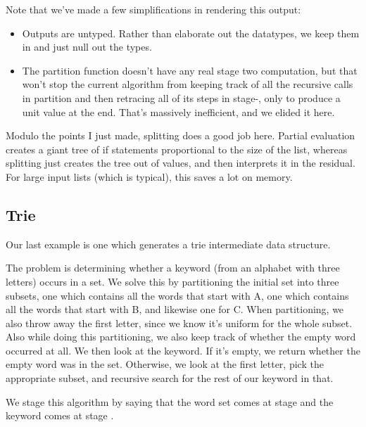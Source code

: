 Note that we've made a few simplifications in rendering this output:
\begin{itemize}
\item Outputs are untyped.  Rather than elaborate out the datatypes, we keep them in and just null out the types.
\item The partition function doesn't have any real stage two computation,
but that won't stop the current algorithm from keeping track of all the recursive calls in partition 
and then retracing all of its steps in stage-\bbtwo, only to produce a unit value at the end.  
That's massively inefficient, and we elided it here.
\end{itemize}

Modulo the points I just made, splitting does a good job here.  
Partial evaluation creates a giant tree of if statements proportional to the size of the list,
whereas splitting just creates the tree out of values, and then interprets it in the residual.
For large input lists (which is typical), this saves a lot on memory.

\subsection{Trie}

Our last example is one which generates a trie intermediate data structure.

The problem is determining whether a keyword (from an alphabet with three letters) occurs in a set.
We solve this by partitioning the initial set into three subsets,
one which contains all the words that start with A,
one which contains all the words that start with B, and likewise one for C.
When partitioning, we also throw away the first letter, since we know it's uniform for the whole subset.
Also while doing this partitioning, we also keep track of whether the empty word occurred at all.
We then look at the keyword.  If it's empty, we return whether the empty word was in the set.
Otherwise, we look at the first letter, pick the appropriate subset, 
and recursive search for the rest of our keyword in that.

We stage this algorithm by saying that the word set comes at stage \bbone
and the keyword comes at stage \bbtwo.

